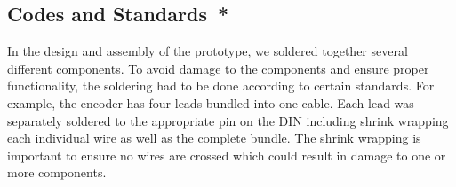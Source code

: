 \subsection*{Codes and Standards{{\color{red}\ *}}}
In the design and assembly of the prototype, we soldered together several different components. To avoid damage to the components and ensure proper functionality, the soldering had to be done according to certain standards. For example, the encoder has four leads bundled into one cable. Each lead was separately soldered to the appropriate pin on the DIN including shrink wrapping each individual wire as well as the complete bundle. The shrink wrapping is important to ensure no wires are crossed which could result in damage to one or more components. 